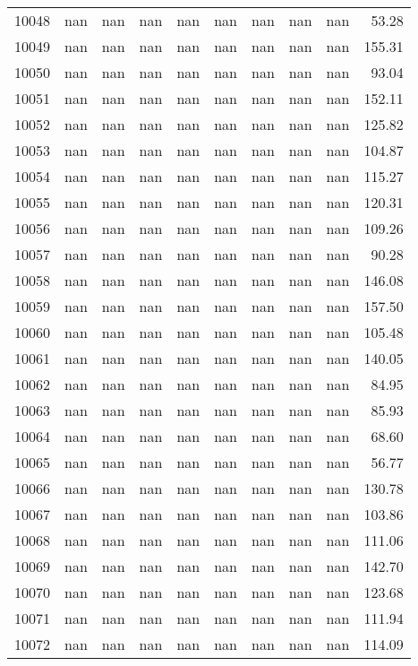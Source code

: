 \begin{tabular}{lrrrrrrrrr}
10048 & nan & nan & nan & nan & nan & nan & nan & nan & 53.28 \\
10049 & nan & nan & nan & nan & nan & nan & nan & nan & 155.31 \\
10050 & nan & nan & nan & nan & nan & nan & nan & nan & 93.04 \\
10051 & nan & nan & nan & nan & nan & nan & nan & nan & 152.11 \\
10052 & nan & nan & nan & nan & nan & nan & nan & nan & 125.82 \\
10053 & nan & nan & nan & nan & nan & nan & nan & nan & 104.87 \\
10054 & nan & nan & nan & nan & nan & nan & nan & nan & 115.27 \\
10055 & nan & nan & nan & nan & nan & nan & nan & nan & 120.31 \\
10056 & nan & nan & nan & nan & nan & nan & nan & nan & 109.26 \\
10057 & nan & nan & nan & nan & nan & nan & nan & nan & 90.28 \\
10058 & nan & nan & nan & nan & nan & nan & nan & nan & 146.08 \\
10059 & nan & nan & nan & nan & nan & nan & nan & nan & 157.50 \\
10060 & nan & nan & nan & nan & nan & nan & nan & nan & 105.48 \\
10061 & nan & nan & nan & nan & nan & nan & nan & nan & 140.05 \\
10062 & nan & nan & nan & nan & nan & nan & nan & nan & 84.95 \\
10063 & nan & nan & nan & nan & nan & nan & nan & nan & 85.93 \\
10064 & nan & nan & nan & nan & nan & nan & nan & nan & 68.60 \\
10065 & nan & nan & nan & nan & nan & nan & nan & nan & 56.77 \\
10066 & nan & nan & nan & nan & nan & nan & nan & nan & 130.78 \\
10067 & nan & nan & nan & nan & nan & nan & nan & nan & 103.86 \\
10068 & nan & nan & nan & nan & nan & nan & nan & nan & 111.06 \\
10069 & nan & nan & nan & nan & nan & nan & nan & nan & 142.70 \\
10070 & nan & nan & nan & nan & nan & nan & nan & nan & 123.68 \\
10071 & nan & nan & nan & nan & nan & nan & nan & nan & 111.94 \\
10072 & nan & nan & nan & nan & nan & nan & nan & nan & 114.09 \\

\end{tabular}
